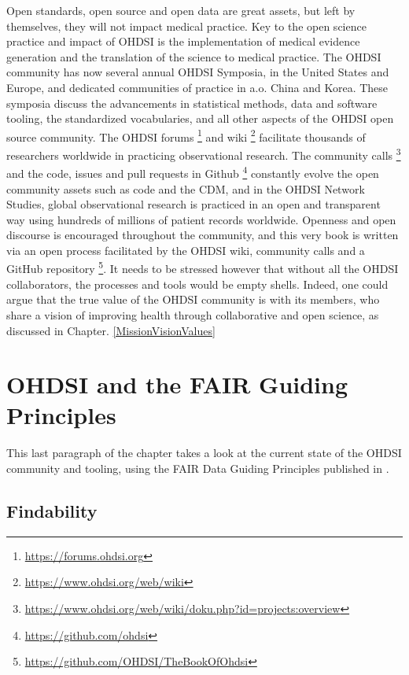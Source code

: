 \documentclass[11pt]{book}
\let\rmarkdownfootnote\footnote%
\def\footnote{\protect\rmarkdownfootnote}
\theoremstyle{definition}
\theoremstyle{definition}
\theoremstyle{definition}
\theoremstyle{remark}
\begin{document}
Open standards, open source and open data are great assets, but left by themselves, they will not impact medical practice. Key to the open science practice and impact of OHDSI is the implementation of medical evidence generation and the translation of the science to medical practice. The OHDSI community has now several annual OHDSI Symposia, in the United States and Europe, and dedicated communities of practice in a.o. China and Korea. These symposia discuss the advancements in statistical methods, data and software tooling, the standardized vocabularies, and all other aspects of the OHDSI open source community. The OHDSI forums \footnote{\url{https://forums.ohdsi.org}} and wiki \footnote{\url{https://www.ohdsi.org/web/wiki}} facilitate thousands of researchers worldwide in practicing observational research. The community calls \footnote{\url{https://www.ohdsi.org/web/wiki/doku.php?id=projects:overview}} and the code, issues and pull requests in Github \footnote{\url{https://github.com/ohdsi}} constantly evolve the open community assets such as code and the CDM, and in the OHDSI Network Studies, global observational research is practiced in an open and transparent way using hundreds of millions of patient records worldwide. Openness and open discourse is encouraged throughout the community, and this very book is written via an open process facilitated by the OHDSI wiki, community calls and a GitHub repository \footnote{\url{https://github.com/OHDSI/TheBookOfOhdsi}}. It needs to be stressed however that without all the OHDSI collaborators, the processes and tools would be empty shells. Indeed, one could argue that the true value of the OHDSI community is with its members, who share a vision of improving health through collaborative and open science, as discussed in Chapter. \ref{MissionVisionValues}

\hypertarget{ohdsi-and-the-fair-guiding-principles}{%
\section{OHDSI and the FAIR Guiding Principles}\label{ohdsi-and-the-fair-guiding-principles}}


This last paragraph of the chapter takes a look at the current state of the OHDSI community and tooling, using the FAIR Data Guiding Principles published in \citet{wilkinson2016}.

\hypertarget{findability}{%
\subsection{Findability}\label{findability}}
\end{document}
